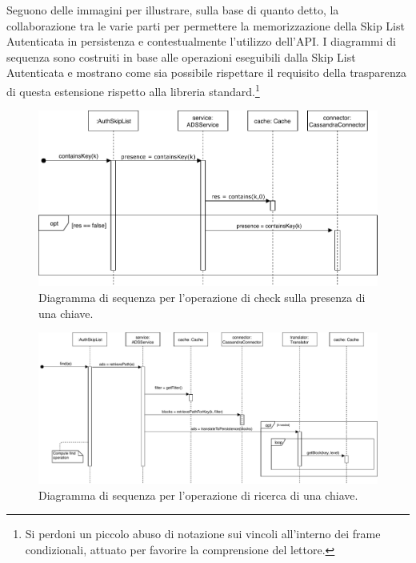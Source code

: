 

	Seguono delle immagini per illustrare, sulla base di quanto detto, la collaborazione tra le varie parti per permettere la memorizzazione della Skip List Autenticata in persistenza e contestualmente l'utilizzo dell'API. I diagrammi di sequenza sono costruiti in base alle operazioni eseguibili dalla Skip List Autenticata e mostrano come sia possibile rispettare il requisito della trasparenza di questa estensione rispetto alla libreria standard.\footnote{Si perdoni un piccolo abuso di notazione sui vincoli all'interno dei frame condizionali, attuato per favorire la comprensione del lettore.}

	\begin{figure}
		\centering
		\includegraphics[scale=0.6]{figure/containsKeySD.pdf}
		\caption{Diagramma di sequenza per l'operazione di check sulla presenza di una chiave.}\label{fig:containsKeySD}
	\end{figure}

	\begin{figure}
		\centering
		\includegraphics[scale=0.6]{figure/findSD.pdf}
		\caption{Diagramma di sequenza per l'operazione di ricerca di una chiave.}\label{fig:findSD}
	\end{figure}

